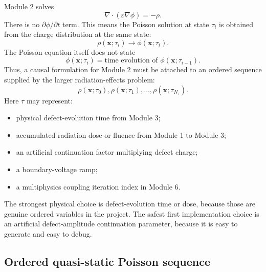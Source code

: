 \documentclass[11pt]{article}
\newcommand{\xv}{\bm{x}}
\newcommand{\taud}{\tau}
\begin{document}
Module 2 solves
\begin{equation}
\nabla\cdot(\varepsilon\nabla\phi)=-\rho.
\end{equation}
There is no $\partial\phi/\partial t$ term. This means the Poisson solution at state $\taud_i$ is obtained from the charge distribution at the same state:
\begin{equation}
\rho(\xv;\taud_i)\longrightarrow \phi(\xv;\taud_i).
\end{equation}
The Poisson equation itself does not state
\begin{equation}
\phi(\xv;\taud_i)=\text{time evolution of }\phi(\xv;\taud_{i-1}).
\end{equation}
Thus, a causal formulation for Module 2 must be attached to an ordered sequence supplied by the larger radiation-effects problem:
\begin{equation}
\rho(\xv;\taud_0),\rho(\xv;\taud_1),\ldots,\rho(\xv;\taud_{N_\taud}).
\end{equation}
Here $\taud$ may represent:
\begin{itemize}[leftmargin=2em]
\item physical defect-evolution time from Module 3;
\item accumulated radiation dose or fluence from Module 1 to Module 3;
\item an artificial continuation factor multiplying defect charge;
\item a boundary-voltage ramp;
\item a multiphysics coupling iteration index in Module 6.
\end{itemize}

The strongest physical choice is defect-evolution time or dose, because those are genuine ordered variables in the project. The safest first implementation choice is an artificial defect-amplitude continuation parameter, because it is easy to generate and easy to debug.

\subsection{Ordered quasi-static Poisson sequence}
\end{document}
